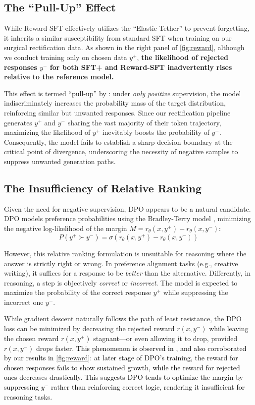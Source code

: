 \documentclass{article}
\newcommand{\modify}[1]{\textcolor{black}{#1}} %
\theoremstyle{plain}
\theoremstyle{definition}
\theoremstyle{remark}
\begin{document}
\subsection{The ``Pull-Up'' Effect}

While Reward-SFT effectively utilizes the ``Elastic Tether'' to prevent forgetting, it inherits a similar susceptibility from standard SFT when training on our surgical rectification data. As shown in the right panel of \cref{fig:reward}, although we conduct training only on chosen data $y^+$, \textbf{the likelihood of rejected responses $y^-$ for both SFT+ and Reward-SFT inadvertently rises relative to the reference model.}

This effect is termed ``pull-up''  by \citet{renlearning}: under \textit{only positive} supervision, the model indiscriminately increases the probability mass of the target distribution, reinforcing similar but unwanted responses. Since our rectification pipeline generates $y^+$ and $y^-$ sharing the vast majority of their token trajectory, maximizing the likelihood of $y^+$ inevitably boosts the probability of $y^-$. Consequently, the model fails to establish a sharp decision boundary at the critical point of divergence, underscoring the necessity of negative samples to suppress unwanted generation paths.

\subsection{The Insufficiency of Relative Ranking}
\label{sec:insufficiency}
Given the need for negative supervision, DPO appears to be a natural candidate. DPO models preference probabilities using the Bradley-Terry model \citep{bradley1952rank}, minimizing the negative log-likelihood of the margin $M = r_\theta(x, y^+) - r_\theta(x, y^-)$:
\begin{equation}
P(y^+ \succ y^-) = \sigma(r_\theta(x, y^+) - r_\theta(x, y^-))
\end{equation}

However, this relative ranking formulation is unsuitable for reasoning where the answer is strictly right or wrong. In preference alignment tasks (e.g., creative writing), it suffices for a response to be \textit{better} than the alternative. Differently, in reasoning, a step is objectively \textit{correct} or \textit{incorrect}. The model is expected to maximize the probability of the correct response $y^+$ while suppressing the incorrect one $y^-$.

While gradient descent naturally follows the path of least resistance, the DPO loss can be minimized by decreasing the rejected reward $r(x,y^-)$ while leaving the chosen reward $r(x,y^+)$ stagnant—or even allowing it to drop, provided $r(x,y^-)$ drops faster. \modify{This phenomenon is observed in \citet{rafailovr, pal2024smaug, renlearning}, and also corroborated by our results in \cref{fig:reward}: at later stage of DPO's training, the reward for chosen responses fails to show sustained growth, while the reward for rejected ones decreases drastically. This suggests DPO tends to optimize the margin by suppressing $y^-$ rather than reinforcing correct logic, rendering it insufficient for reasoning tasks.}
\end{document}
